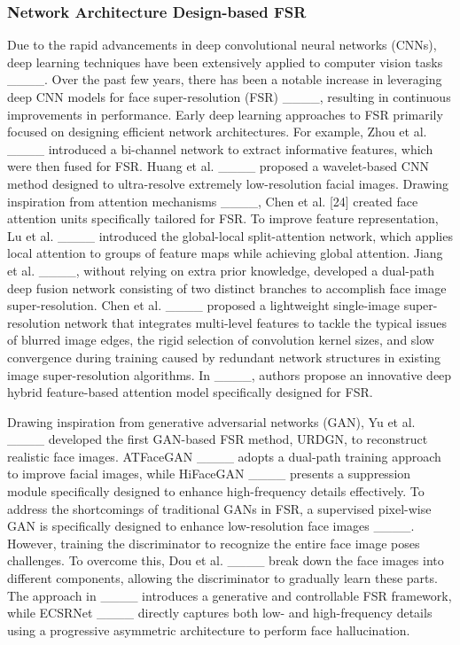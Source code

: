 \subsubsection{Network Architecture Design-based FSR}
Due to the rapid advancements in deep convolutional neural networks (CNNs), deep learning techniques have been extensively applied to computer vision tasks ____. Over the past few years, there has been a notable increase in leveraging deep CNN models for face super-resolution (FSR) ____, resulting in continuous improvements in performance. Early deep learning approaches to FSR primarily focused on designing efficient network architectures. For example, Zhou et al. ____ introduced a bi-channel network to extract informative features, which were then fused for FSR. Huang et al. ____ proposed a wavelet-based CNN method designed to ultra-resolve extremely low-resolution facial images. Drawing inspiration from attention mechanisms ____, Chen et al. [24] created face attention units specifically tailored for FSR. To improve feature representation, Lu et al. ____ introduced the global-local split-attention network, which applies local attention to groups of feature maps while achieving global attention. Jiang et al. ____, without relying on extra prior knowledge, developed a dual-path deep fusion network consisting of two distinct branches to accomplish face image super-resolution. Chen et al. ____ proposed a lightweight single-image super-resolution network that integrates multi-level features to tackle the typical issues of blurred image edges, the rigid selection of convolution kernel sizes, and slow convergence during training caused by redundant network structures in existing image super-resolution algorithms. In ____, authors propose an innovative deep hybrid feature-based attention model specifically designed for FSR.

Drawing inspiration from generative adversarial networks (GAN), Yu et al. ____ developed the first GAN-based FSR method, URDGN, to reconstruct realistic face images. ATFaceGAN ____ adopts a dual-path training approach to improve facial images, while HiFaceGAN ____ presents a suppression module specifically designed to enhance high-frequency details effectively. To address the shortcomings of traditional GANs in FSR, a supervised pixel-wise GAN is specifically designed to enhance low-resolution face images ____. However, training the discriminator to recognize the entire face image poses challenges. To overcome this, Dou et al. ____ break down the face images into different components, allowing the discriminator to gradually learn these parts. The approach in ____ introduces a generative and controllable FSR framework, while ECSRNet ____ directly captures both low- and high-frequency details using a progressive asymmetric architecture to perform face hallucination. 
